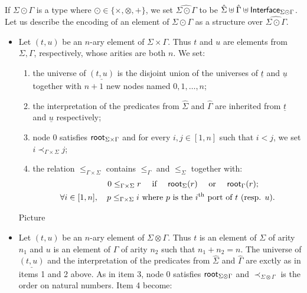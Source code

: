     If $\Sigma \odot \Gamma$ is a type where $\odot \in \{\times, \otimes,+\}$, we set $\widehat{\Sigma\odot\Gamma}$ to be $\hat{\Sigma} \uplus \hat{\Gamma} \uplus \mathsf{Interface}_{\Sigma\odot\Gamma}$. Let us describe the encoding of an element of $\Sigma \odot \Gamma$ as a structure over $\widehat{\Sigma\odot\Gamma}$.
     \begin{itemize}
\item Let $(t,u)$ be an $n$-ary element of $\Sigma \times \Gamma$. Thus $t$ and $u$ are elements from $\Sigma, \Gamma$, respectively, whose arities are both $n$. We set:
        \begin{enumerate}
       \item the universe of $\underline{(t,u)}$ is the disjoint union of the universes of $\underline{t}$ and $\underline{u}$ together with $n+1$ new nodes named $0,1,\dots, n$;
       \item the interpretation of the predicates from $\hat \Sigma$ and $\hat \Gamma$ are inherited from $\underline{t}$ and $\underline {u}$ respectively;
       \item node $0$ satisfies $\mathsf{root}_{\Sigma\times\Gamma}$ and for every $i,j \in[1,n]$ such that $i<j$, we set $i \prec_{\Gamma\times\Sigma} j$;
       \item the relation $\leq_{\Gamma\times\Sigma}$ contains   $\leq_{\Gamma}$ and $\leq_{\Sigma}$ together with:
\begin{align*}
0\leq_{\Gamma\times\Sigma} r \quad\text{ if } \quad \mathsf{root}_{\Sigma}(r) \quad\text{ or }\quad \mathsf{root}_{\Gamma}(r);\qquad\\
\forall i\in[1,n],\quad p \leq_{\Gamma\times\Sigma} i \text{ where } 
p \text{ is the } i^\text{th} \text{ port of } t \text{ (resp.  $u$)}.
\end{align*}  
        \end{enumerate}
        \begin{center}
        Picture
        \end{center}        
\item Let $(t,u)$ be an $n$-ary element of $\Sigma\otimes \Gamma$. Thus $t$ is an element of $\Sigma$ of arity $n_1$ and $u$ is an element of $\Gamma$ of arity $n_2$ such that $n_1+n_2=n$. The universe of $\underline{(t,u)}$ and the interpretation of the predicates from $\hat \Sigma$ and $\hat \Gamma$ are exctly as in items 1 and 2 above. As in item 3, node $0$ satisfies $\mathsf{root}_{\Sigma\otimes \Gamma}$ and $\prec_{\Sigma\otimes \Gamma}$
       is the order on natural numbers. Item 4 become:
       \begin{enumerate}

\end{enumerate}
\end{itemize}
